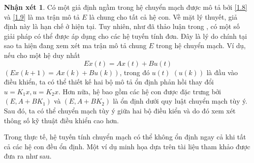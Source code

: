 \documentclass[12pt,a4paper]{report}
\theoremstyle{definition}
\newtheorem{nx}{Nhận xét}
\theoremstyle{definition}
\numberwithin{dl}{chapter}
\numberwithin{vd}{chapter}
\numberwithin{corollary}{chapter}
\numberwithin{lemma}{chapter}
\numberwithin{md}{chapter}
\numberwithin{dn}{chapter}
\numberwithin{cy}{chapter}
\numberwithin{nx}{chapter}
\begin{document}
\begin{nx}\label{Nx1} Có một giả định ngầm trong hệ chuyển mạch được mô tả bởi \eqref{1.8} và \eqref{1.9} là ma trận mô tả  $E$ là chung cho tất cả hệ con. Về mặt lý thuyết, giả định này là hạn chế ở hiện tại. Tuy nhiên, như đã thảo luận trong \cite{Zhai09a} , có một số giải pháp có thể được áp dụng cho các hệ tuyến tính đơn. Đây là lý do chính tại sao ta hiện đang xem xét ma trận mô tả chung $E$ trong hệ chuyển mạch. Ví dụ, nếu cho một hệ duy nhất 
$$
E \dot{x}(t)=A x(t)+B u(t)
$$
$(E x(k+1)=A x(k)+B u(k))$, trong đó $u(t)$ $(u(k))$ là đầu vào điều khiển, ta có thể thiết kế hai bộ mô tả ổn định phản hồi thay đổi $u=K_{1} x, u=K_{2} x$. Hơn nữa, hệ bao gồm các hệ con được đặc trưng bởi $\left(E, A+B K_{1}\right)$ và $\left(E, A+B K_{2}\right)$ là ổn định dưới quy luật chuyển mạch tùy ý. Sau đó, ta có thể chuyển mạch tùy ý giữa hai bộ điều kiển và do đó xem xét thông số kỹ thuật điều khiển cao hơn.\\
\end{nx}
Trong thực tế, hệ tuyến tính chuyển mạch có thể không ổn định ngay cả khi tất cả các hệ con đều ổn định. Một ví dụ minh họa dựa trên tài liệu tham khảo \cite{Br98} được đưa ra như sau.\\
%
\end{document}
